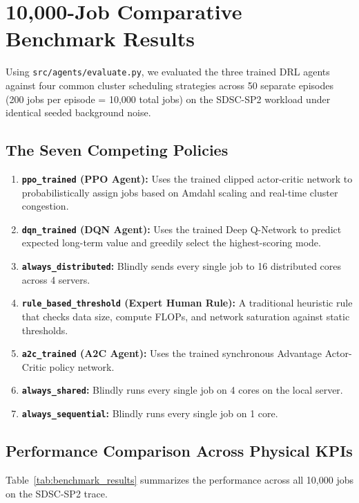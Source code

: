 \documentclass[11pt,a4paper]{article}
\begin{document}
\section{10,000-Job Comparative Benchmark Results}
Using \texttt{src/agents/evaluate.py}, we evaluated the three trained DRL agents against four common cluster scheduling strategies across 50 separate episodes (200 jobs per episode = 10,000 total jobs) on the SDSC-SP2 workload under identical seeded background noise.

\subsection{The Seven Competing Policies}
\begin{enumerate}[noitemsep, topsep=1pt]
    \item \textbf{\texttt{ppo\_trained} (PPO Agent):} Uses the trained clipped actor-critic network to probabilistically assign jobs based on Amdahl scaling and real-time cluster congestion.
    \item \textbf{\texttt{dqn\_trained} (DQN Agent):} Uses the trained Deep Q-Network to predict expected long-term value and greedily select the highest-scoring mode.
    \item \textbf{\texttt{always\_distributed}:} Blindly sends every single job to 16 distributed cores across 4 servers.
    \item \textbf{\texttt{rule\_based\_threshold} (Expert Human Rule):} A traditional heuristic rule that checks data size, compute FLOPs, and network saturation against static thresholds.
    \item \textbf{\texttt{a2c\_trained} (A2C Agent):} Uses the trained synchronous Advantage Actor-Critic policy network.
    \item \textbf{\texttt{always\_shared}:} Blindly runs every single job on 4 cores on the local server.
    \item \textbf{\texttt{always\_sequential}:} Blindly runs every single job on 1 core.
\end{enumerate}

\subsection{Performance Comparison Across Physical KPIs}
Table~\ref{tab:benchmark_results} summarizes the performance across all 10,000 jobs on the SDSC-SP2 trace.
\end{document}
